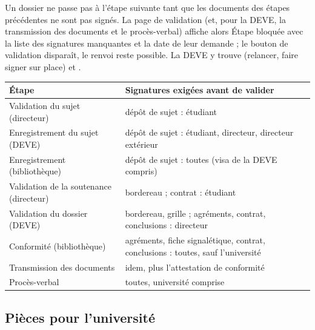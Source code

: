\documentclass[11pt,a4paper]{article}
\begin{document}
Un dossier ne passe pas à l'étape suivante tant que les documents des étapes
précédentes ne sont pas signés. La page de validation (et, pour la DEVE, la
transmission des documents et le procès-verbal) affiche alors \og Étape
bloquée\fg{} avec la liste des signatures manquantes et la date de leur
demande ; le bouton de validation disparaît, le renvoi reste possible. La DEVE y
trouve  (relancer, faire signer sur place) et
.


\begin{center}
\small
\begin{tabularx}{\linewidth}{@{}l X@{}}
\toprule
\textbf{Étape} & \textbf{Signatures exigées avant de valider} \\
\midrule
Validation du sujet (directeur) & dépôt de sujet : étudiant \\
Enregistrement du sujet (DEVE) & dépôt de sujet : étudiant, directeur, directeur extérieur \\
Enregistrement (bibliothèque) & dépôt de sujet : toutes (visa de la DEVE compris) \\
Validation de la soutenance (directeur) & bordereau ; contrat : étudiant \\
Validation du dossier (DEVE) & bordereau, grille ; agréments,
contrat, conclusions : directeur \\
Conformité (bibliothèque) & agréments, fiche signalétique, contrat,
conclusions : toutes, sauf l'université \\
Transmission des documents & idem, plus l'attestation de conformité \\
Procès-verbal & toutes, université comprise \\
\bottomrule
\end{tabularx}
\end{center}

\subsection{Pièces pour l'université}\label{sec:universite}
\end{document}
